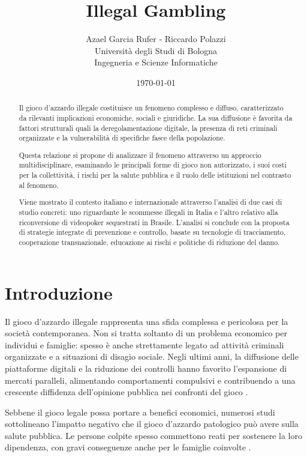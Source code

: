 \documentclass[a4paper,12pt]{article}
\title{\textbf{Illegal Gambling}}
\author{Azael Garcia Rufer - Riccardo Polazzi \\ Università degli Studi di Bologna \\ Ingegneria e Scienze Informatiche}
\date{\today}
\begin{document}
\maketitle

\begin{abstract}
    Il gioco d’azzardo illegale costituisce un fenomeno complesso e diffuso, caratterizzato da rilevanti implicazioni economiche, sociali e giuridiche. La sua diffusione è favorita da fattori strutturali quali la deregolamentazione digitale, la presenza di reti criminali organizzate e la vulnerabilità di specifiche fasce della popolazione.

    Questa relazione si propone di analizzare il fenomeno attraverso un approccio multidisciplinare, esaminando le principali forme di gioco non autorizzato, i suoi costi per la collettività, i rischi per la salute pubblica e il ruolo delle istituzioni nel contrasto al fenomeno.
    
    Viene mostrato il contesto italiano e internazionale attraverso l’analisi di due casi di studio concreti: uno riguardante le scommesse illegali in Italia e l’altro relativo alla riconversione di videopoker sequestrati in Brasile. L’analisi si conclude con la proposta di strategie integrate di prevenzione e controllo, basate su tecnologie di tracciamento, cooperazione transnazionale, educazione ai rischi e politiche di riduzione del danno.
\end{abstract}

\newpage
\tableofcontents
\newpage
\section{Introduzione}

Il gioco d’azzardo illegale rappresenta una sfida complessa e pericolosa per la società contemporanea. Non si tratta soltanto di un problema economico per individui e famiglie: spesso è anche strettamente legato ad attività criminali organizzate e a situazioni di disagio sociale. Negli ultimi anni, la diffusione delle piattaforme digitali e la riduzione dei controlli hanno favorito l’espansione di mercati paralleli, alimentando comportamenti compulsivi e contribuendo a una crescente diffidenza dell’opinione pubblica nei confronti del gioco \cite{banks2018taxonomy}.

Sebbene il gioco legale possa portare a benefici economici, numerosi studi sottolineano l’impatto negativo che il gioco d’azzardo patologico può avere sulla salute pubblica. Le persone colpite spesso commettono reati per sostenere la loro dipendenza, con gravi conseguenze anche per le famiglie coinvolte \cite{gorsane2017illegalacts, lucchini2022socialcosts}.
\end{document}
